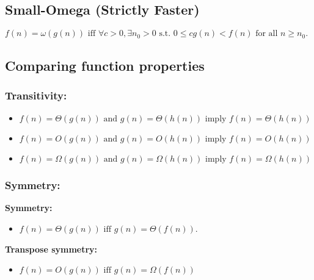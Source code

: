\documentclass{article}
\begin{document}
\subsection{Small-Omega (Strictly Faster)}
\begin{definition}
    $f(n) = \omega(g(n)) \text{ iff } \forall c > 0, \exists n_0 > 0 \text{ s.t. } 0 \leq c g(n) < f(n) \text{ for all } n \geq n_0.$
\end{definition}

\subsection{Comparing function properties}
\subsubsection{Transitivity:}
\begin{definition}
    \begin{itemize}
        \item $f(n) = \Theta(g(n)) \text{ and } g(n)=\Theta(h(n)) \text{ imply } f(n) = \Theta(h(n))$
        \item $f(n) = O(g(n)) \text{ and } g(n)=O(h(n)) \text{ imply } f(n) = O(h(n))$
        \item $f(n) = \Omega(g(n)) \text{ and } g(n)=\Omega(h(n)) \text{ imply } f(n) = \Omega(h(n))$
    \end{itemize}
\end{definition}

\subsubsection{Symmetry:}
\begin{definition}

    \textbf{Symmetry:}
    \begin{itemize}
        \item $f(n) = \Theta(g(n)) \text{ iff } g(n) = \Theta(f(n))$.
    \end{itemize}
    \vspace{1em}

    \textbf{Transpose symmetry:}
    \begin{itemize}
        \item $f(n) = O(g(n)) \text{ iff } g(n) = \Omega(f(n))$
    \end{itemize}
\end{definition}
\end{document}
